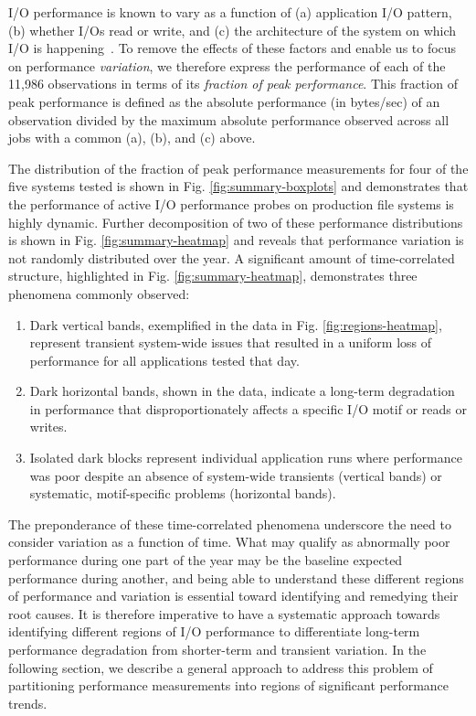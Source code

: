 I/O performance is known to vary as a function of (a) application I/O pattern, (b) whether I/Os read or write, and (c) the architecture of the system on which I/O is happening~\cite{Lockwood2017, Xie2012}.
To remove the effects of these factors and enable us to focus on performance \emph{variation}, we therefore express the performance of each of the 11,986 observations in terms of its \emph{fraction of peak performance}.
This fraction of peak performance is defined as the absolute performance (in bytes/sec) of an observation divided by the maximum absolute performance observed across all jobs with a common (a), (b), and (c) above.

The distribution of the fraction of peak performance measurements for four of the five systems tested is shown in Fig. \ref{fig:summary-boxplots} and demonstrates that the performance of active I/O performance probes on production file systems is highly dynamic.
Further decomposition of two of these performance distributions is shown in Fig. \ref{fig:summary-heatmap} and reveals that performance variation is not randomly distributed over the year.
A significant amount of time-correlated structure, highlighted in Fig. \ref{fig:summary-heatmap}, demonstrates three phenomena commonly observed:

\begin{enumerate}[leftmargin=*]
\item Dark vertical bands, exemplified in the \mira data in Fig. \ref{fig:regions-heatmap}, represent transient system-wide issues that resulted in a uniform loss of performance for all applications tested that day.
\item Dark horizontal bands, shown in the \cori data, indicate a long-term degradation in performance that disproportionately affects a specific I/O motif or reads or writes.
\item Isolated dark blocks represent individual application runs where performance was poor despite an absence of system-wide transients (vertical bands) or systematic, motif-specific problems (horizontal bands).
\end{enumerate}


The preponderance of these time-correlated phenomena underscore the need to consider variation as a function of time.
What may qualify as abnormally poor performance during one part of the year may be the baseline expected performance during another, and being able to understand these different regions of performance and variation is essential toward identifying and remedying their root causes.
It is therefore imperative to have a systematic approach towards identifying different regions of I/O performance to differentiate long-term performance degradation from shorter-term and transient variation.
In the following section, we describe a general approach to address this problem of partitioning performance measurements into regions of significant performance trends.

